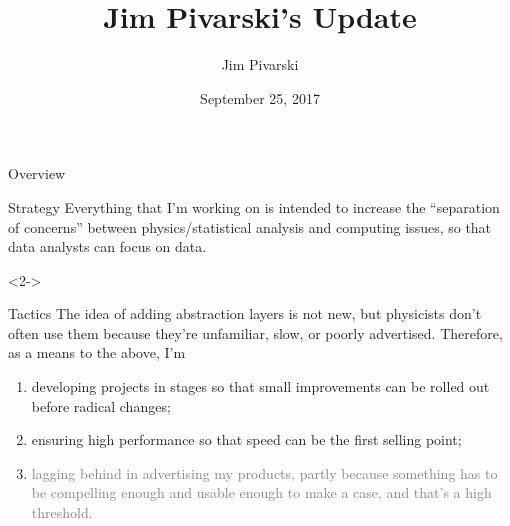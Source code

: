 \documentclass{beamer}
\title[2017-09-25-dianahep-update]{Jim Pivarski's Update}
\author{Jim Pivarski}
\institute{Princeton University -- DIANA}
\date{September 25, 2017}
\begin{document}

\begin{frame}
  \titlepage
\end{frame}




\begin{frame}{Overview}
\vspace{0.25 cm}
\begin{block}{Strategy}
Everything that I'm working on is intended to increase the ``separation of concerns'' between physics/statistical analysis and computing issues, so that data analysts can focus on data.
\end{block}

\begin{uncoverenv}<2->
\begin{block}{Tactics}
The idea of adding abstraction layers is not new, but physicists don't often use them because they're unfamiliar, slow, or poorly advertised. Therefore, as a means to the above, I'm
\begin{enumerate}
\item<3-> developing projects in stages so that small improvements can be rolled out before radical changes;
\item<4-> ensuring high performance so that speed can be the first selling point;
\item<5-> \textcolor{gray}{lagging behind in advertising my products, partly because something has to be compelling enough and usable enough to make a case, and that's a high threshold.}
\end{enumerate}
\end{block}
\end{uncoverenv}
\end{frame}
\end{document}
